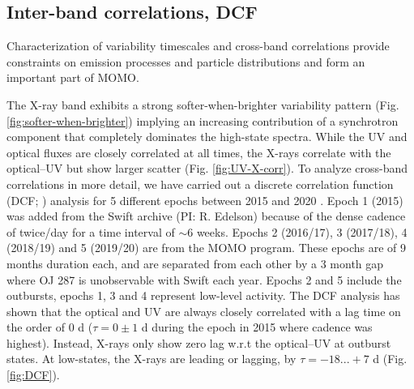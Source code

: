 \documentclass[preprints,article,accept,moreauthors,pdftex]{Definitions/mdpi}
\begin{document}
{\subsection{Inter-band correlations, DCF}

Characterization of variability timescales and cross-band correlations provide constraints on emission processes and particle distributions \citep{Sokolov2004, Kirk1998, Marscher2014} and form an important part of MOMO. 
%

The X-ray band exhibits a strong softer-when-brighter variability pattern (Fig. \ref{fig:softer-when-brighter}) implying an increasing contribution of a synchrotron component that completely dominates the high-state spectra. 
While the UV and optical fluxes are closely correlated at all times, the X-rays correlate with the optical--UV but show larger scatter (Fig. \ref{fig:UV-X-corr}). 
%
To analyze cross-band correlations in more detail, we have carried out a discrete correlation function (DCF; \citep{Edelson2017}) analysis for 5 different epochs between 2015 and 2020 \citep{Komossa2021c}. Epoch 1 (2015) was added from the Swift archive (PI: R. Edelson) because of the dense cadence of twice/day for a time interval of $\sim$6 weeks. Epochs 2 (2016/17), 3 (2017/18), 4 (2018/19) and 5 (2019/20) are from the MOMO program. These epochs are of 9 months duration each, and are separated from each other by a 3 month gap where OJ 287 is unobservable with Swift each year. Epochs 2 and 5 include the outbursts, epochs 1, 3 and 4 represent low-level activity.  
% 
The DCF analysis has shown that the optical and UV are always closely correlated with a lag time on the order of 0 d ($\tau = 0\pm1$ d during the epoch in 2015 where cadence was highest).  Instead, X-rays only show zero lag w.r.t the optical--UV at outburst states. At low-states, the X-rays are leading or lagging, by $\tau = -18 ... +7$ d (Fig. \ref{fig:DCF}). 

}
\end{document}
